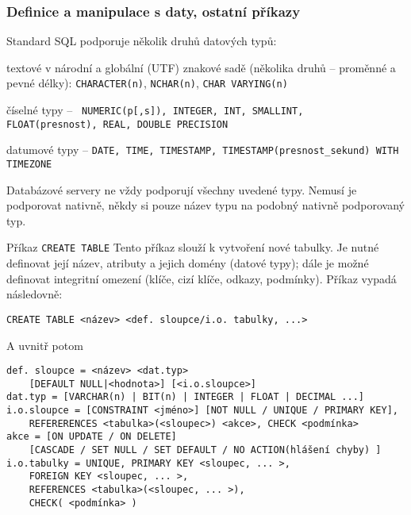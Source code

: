\subsubsection*{Definice a manipulace s daty, ostatní příkazy}

Standard SQL podporuje několik druhů datových typů:
\begin{pitemize}
    \item textové v národní a globální (UTF) znakové sadě (několika druhů -- proměnné a pevné délky): \texttt{CHARACTER(n)}, \texttt{NCHAR(n)},
    \texttt{CHAR VARYING(n)}
    \item číselné typy -- \texttt{ NUMERIC(p[,s]), INTEGER, INT, SMALLINT,\\  FLOAT(presnost), REAL, DOUBLE PRECISION}
    \item datumové typy -- \texttt{DATE, TIME, TIMESTAMP, TIMESTAMP(presnost\_sekund) WITH TIMEZONE}
\end{pitemize}
Databázové servery ne vždy podporují všechny uvedené typy. Nemusí je podporovat nativně, někdy si pouze  název typu na podobný nativně podporovaný typ.

\medskip
\begin{obecne}{Příkaz \texttt{CREATE TABLE}}
Tento příkaz slouží k vytvoření nové tabulky. Je nutné definovat její název, atributy a jejich domény (datové typy); dále je možné definovat integritní omezení (klíče, cizí klíče, odkazy, podmínky). Příkaz vypadá následovně:
\begin{center}
\texttt{CREATE TABLE <název> <def. sloupce/i.o. tabulky, ...> }
\end{center}
A uvnitř potom
\begin{verbatim}
def. sloupce = <název> <dat.typ> 
    [DEFAULT NULL|<hodnota>] [<i.o.sloupce>] 
dat.typ = [VARCHAR(n) | BIT(n) | INTEGER | FLOAT | DECIMAL ...] 
i.o.sloupce = [CONSTRAINT <jméno>] [NOT NULL / UNIQUE / PRIMARY KEY], 
    REFERERENCES <tabulka>(<sloupec>) <akce>, CHECK <podmínka> 
akce = [ON UPDATE / ON DELETE] 
    [CASCADE / SET NULL / SET DEFAULT / NO ACTION(hlášení chyby) ] 
i.o.tabulky = UNIQUE, PRIMARY KEY <sloupec, ... >, 
    FOREIGN KEY <sloupec, ... >, 
    REFERENCES <tabulka>(<sloupec, ... >), 
    CHECK( <podmínka> )
\end{verbatim}
\end{obecne}

